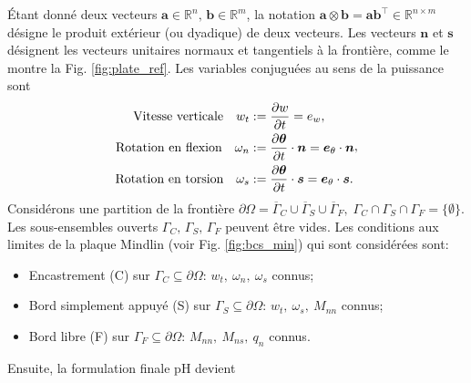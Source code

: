 Étant donné deux vecteurs $\bm{a} \in \mathbb{R}^n, \, \bm{b} \in \mathbb{R}^m $, la notation $ \bm{a} \otimes {\bm{b}} = \bm{a} \bm{b}^\top \in \mathbb{R}^{n \times m} $ désigne le produit extérieur (ou dyadique) de deux vecteurs. Les vecteurs $\bm{n} $ et $ \bm{s}$ désignent les vecteurs unitaires normaux et tangentiels à la frontière, comme le montre la Fig. \ref{fig:plate_ref}. Les variables conjuguées au sens de la puissance sont
\begin{equation*} 
\begin{aligned}
\text{Vitesse verticale}  \quad w_t &:= \diffp{w}{t} = e_w, \\
\text{Rotation en flexion} \quad 
\omega_{n} &:= \diffp{\bm{\theta}}{t} \cdot \bm{n} = \bm{e}_\theta \cdot \bm{n} \\
\text{Rotation en torsion} \quad 
\omega_{s} &:= \diffp{\bm{\theta}}{t} \cdot \bm{s} = \bm{e}_\theta \cdot \bm{s}.	
\end{aligned},
\end{equation*}
Considérons une partition de la frontière $\partial\Omega = \overline{\Gamma}_{C} \cup \overline {\Gamma}_{S} \cup \overline {\Gamma}_{F}, \; {\Gamma}_{C} \cap{\Gamma}_{S} \cap {\Gamma}_{F} = \{\emptyset\} $. Les sous-ensembles ouverts $\Gamma_{C}, \, \Gamma_{S}, \, \Gamma_{F} $ peuvent être vides. Les conditions aux limites de la plaque Mindlin \cite{duran1999approximation} (voir Fig. \ref{fig:bcs_min}) qui sont considérées sont:
\begin{itemize}
\item Encastrement (C) sur $\Gamma_{C} \subseteq \partial \Omega $: $ w_t, \ \omega_{n}, \ \omega_{s}$ connus;
\item Bord simplement appuyé  (S) sur $\Gamma_{S} \subseteq \partial \Omega $: $ w_t, \ \omega_{s}, \ M_{nn} $ connus;
\item  Bord libre (F) sur $ \Gamma_{F} \subseteq \partial \Omega $: $ M_{nn}, \ M_{ns}, \ q_n$ connus.
\end{itemize}
Ensuite, la formulation finale pH devient
